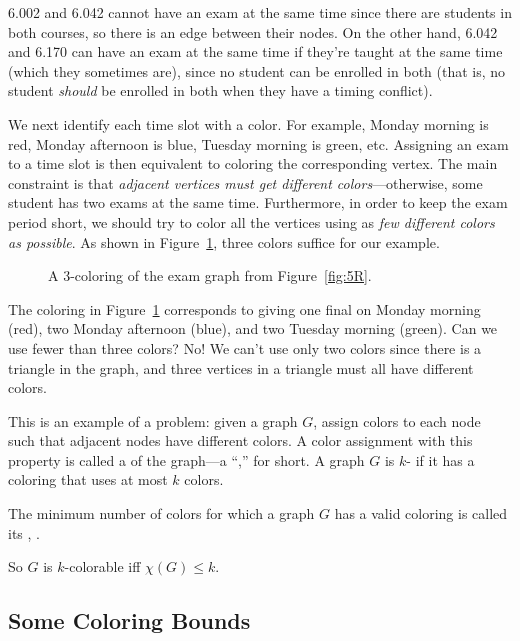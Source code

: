6.002 and 6.042 cannot have an exam at the same time since there are
students in both courses, so there is an edge between their nodes.  On the
other hand, 6.042 and 6.170 can have an exam at the same time if they're
taught at the same time (which they sometimes are), since no student can
be enrolled in both (that is, no student \emph{should} be enrolled in both
when they have a timing conflict).

We next identify each time slot with a color.  For example, Monday
morning is red, Monday afternoon is blue, Tuesday morning is green,
etc.  Assigning an exam to a time slot is then equivalent to coloring
the corresponding vertex.  The main constraint is that \emph{adjacent
  vertices must get different colors}---otherwise, some student has
two exams at the same time.  Furthermore, in order to keep the exam
period short, we should try to color all the vertices using as
\emph{few different colors as possible}.  As shown in Figure~\ref{fig:5S},
three colors suffice for our example.

\begin{figure}
\caption{A 3-coloring of the exam graph from Figure~\ref{fig:5R}.}
\label{fig:5S}
\end{figure}

The coloring in Figure~\ref{fig:5S} corresponds to giving one final on
Monday morning (red), two Monday afternoon (blue), and two Tuesday
morning (green).  Can we use fewer than three colors?  No! We can't
use only two colors since there is a triangle in the graph, and three
vertices in a triangle must all have different colors.

This is an example of a  problem:
 given a graph $G$, assign colors to each
node such that adjacent nodes have different colors.  A color assignment
with this property is called a   of the graph---a ``,'' for short.  A graph $G$
is $k$- if it has a coloring that uses at most $k$ colors.
\begin{definition}
  The minimum number of colors for which a graph $G$ has a valid coloring is
  called its , .
\end{definition}
So $G$ is $k$-colorable iff $\chi(G) \leq k$.

\subsection{Some Coloring Bounds}

